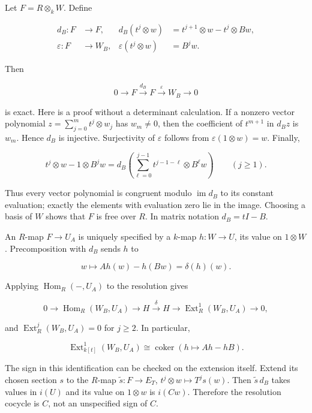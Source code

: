 \documentclass[
  11pt,
]{article}
\begin{document}
Let \(F=R\otimes_k W\). Define

\[\begin{aligned}
d_B:F&\longrightarrow F,&
d_B(t^j\otimes w)&=t^{j+1}\otimes w-t^j\otimes Bw,\\
\varepsilon:F&\longrightarrow W_B,&
\varepsilon(t^j\otimes w)&=B^jw.
\end{aligned}\]

Then

\[0\longrightarrow F\xrightarrow{d_B}F
\xrightarrow{\varepsilon}W_B\longrightarrow0\tag{9}\]

is exact. Here is a proof without a determinant calculation. If a
nonzero vector polynomial \(z=\sum_{j=0}^m t^j\otimes w_j\) has
\(w_m\ne0\), then the coefficient of \(t^{m+1}\) in \(d_Bz\) is \(w_m\).
Hence \(d_B\) is injective. Surjectivity of \(\varepsilon\) follows from
\(\varepsilon(1\otimes w)=w\). Finally,

\[t^j\otimes w-1\otimes B^jw
=d_B\left(\sum_{\ell=0}^{j-1}t^{j-1-\ell}\otimes B^\ell w\right)
\qquad(j\ge1).\tag{10}\]

Thus every vector polynomial is congruent modulo
\(\operatorname{im}d_B\) to its constant evaluation; exactly the
elements with evaluation zero lie in the image. Choosing a basis of
\(W\) shows that \(F\) is free over \(R\). In matrix notation
\(d_B=tI-B\).

An \(R\)-map \(F\to U_A\) is uniquely specified by a \(k\)-map
\(h:W\to U\), its value on \(1\otimes W\). Precomposition with \(d_B\)
sends \(h\) to

\[w\longmapsto Ah(w)-h(Bw)=\delta(h)(w).\]

Applying \(\operatorname{Hom}_R(-,U_A)\) to the resolution gives

\[0\longrightarrow\operatorname{Hom}_R(W_B,U_A)
\longrightarrow H\xrightarrow{\delta}H
\longrightarrow\operatorname{Ext}^1_R(W_B,U_A)
\longrightarrow0,\tag{11}\]

and \(\operatorname{Ext}^j_R(W_B,U_A)=0\) for \(j\ge2\). In particular,

\[\boxed{\operatorname{Ext}^1_{k[t]}(W_B,U_A)
\cong\operatorname{coker}(h\mapsto Ah-hB).}\tag{12}\]

The sign in this identification can be checked on the extension itself.
Extend its chosen section \(s\) to the \(R\)-map
\(\widetilde s:F\to E_T\), \(t^j\otimes w\mapsto T^js(w)\). Then
\(\widetilde s\,d_B\) takes values in \(i(U)\) and its value on
\(1\otimes w\) is \(i(Cw)\). Therefore the resolution cocycle is \(C\),
not an unspecified sign of \(C\).
\end{document}
